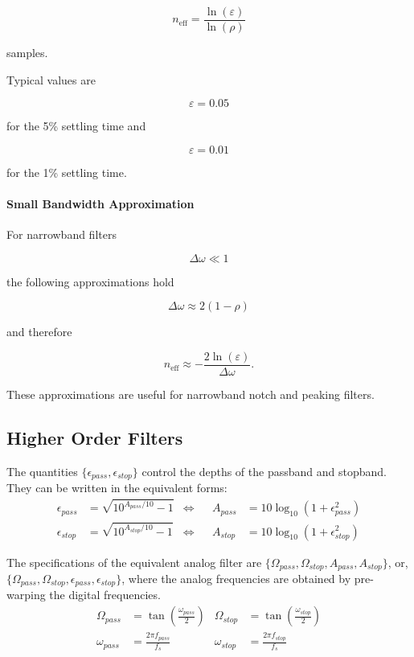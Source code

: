 \[
\boxed{
n_{\mathrm{eff}}
=
\frac{\ln(\varepsilon)}
{\ln(\rho)}
}
\]

samples.

Typical values are

\[
\varepsilon=0.05
\]

for the 5\% settling time and

\[
\varepsilon=0.01
\]

for the 1\% settling time.

\paragraph{Small Bandwidth Approximation}

For narrowband filters

\[
\Delta\omega\ll1
\]

the following approximations hold

\[
\boxed{
\Delta\omega
\approx
2(1-\rho)
}
\]

and therefore

\[
\boxed{
n_{\mathrm{eff}}
\approx
-\frac{2\ln(\varepsilon)}
{\Delta\omega}.
}
\]

These approximations are useful for narrowband notch and peaking filters.


\subsection{Higher Order Filters}
The quantities $\{\epsilon_{pass}, \epsilon_{stop}\}$ control the depths of the passband and stopband.
They can be written in the equivalent forms:
\begin{align*}
	\epsilon_{pass} &= \sqrt{10^{A_{pass}/10} - 1} & \Longleftrightarrow &&
	A_{pass}&= 10\log_{10}(1 + \epsilon_{pass}^2) \\
	\epsilon_{stop} &= \sqrt{10^{A_{stop}/10} - 1} & \Longleftrightarrow &&
	A_{stop}&= 10\log_{10}(1 + \epsilon_{stop}^2)
\end{align*}

The specifications of the equivalent analog filter are $\{\Omega_{pass}, \Omega_{stop}, A_{pass}, A_{stop} \}$, or, $\{\Omega_{pass}, \Omega_{stop}, \epsilon_{pass}, \epsilon_{stop} \}$, where the analog frequencies are obtained by pre-warping the digital frequencies.
\begin{align*}
	\Omega_{pass} &= \tan\left(\frac{\omega_{pass}}{2}\right) &
	\Omega_{stop} &= \tan\left(\frac{\omega_{stop}}{2}\right) \\
	\omega_{pass} &= \frac{2\pi f_{pass}}{f_s} &
	\omega_{stop} &= \frac{2\pi f_{stop}}{f_s}
\end{align*}

